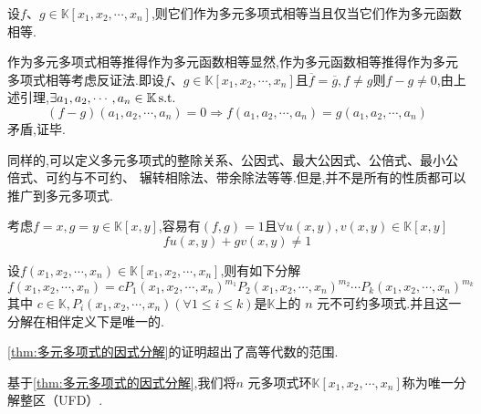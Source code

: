 \begin{green}
\begin{corollary}[充要条件]\label{cor:充要条件}
     设$f$、$g\in\mathbb{K}\left[
        x_1,x_2,\cdots,x_n
    \right]$,则它们作为多元多项式相等当且仅当它们作为多元函数相等.
\end{corollary}
\begin{Proof}
作为多元多项式相等推得作为多元函数相等显然,作为多元函数相等推得作为多元多项式相等考虑反证法.即设$f$、$g\in\mathbb{K}\left[
    x_1,x_2,\cdots,x_n
\right]$且$\overline{f}=\overline{g},f\neq g$则$f-g\neq 0$,由上述引理,$\exists a_1,a_2,\cdots,a_n\in\mathbb{K}\,\textup{s.t.}$
\[
\left(f-g\right)
\left(
    a_1,a_2,\cdots,a_n
\right)=0\Longrightarrow
f\left(
    a_1,a_2,\cdots,a_n
\right)=g\left(
    a_1,a_2,\cdots,a_n
\right)
\]
矛盾,证毕.
\end{Proof}
\end{green}
\begin{red}
\begin{remark}
    同样的,可以定义多元多项式的整除关系、公因式、最大公因式、公倍式、最小公倍式、可约与不可约、
    辗转相除法、带余除法等等.但是,并不是所有的性质都可以推广到多元多项式.
\end{remark}
\end{red}
\begin{brown}
\begin{example}
    考虑$f=x,g=y\in\mathbb{K}\left[x,y\right]$,容易有$\left(f,g\right)=1$且$\forall 
    u\left(x,y\right),v\left(x,y\right)\in\mathbb{K}\left[x,y\right]$
    \[
     fu\left(x,y\right) +gv\left(x,y\right)\neq 1
    \]
\end{example}
\end{brown}
\begin{formal}
\begin{theorem}[多元多项式的因式分解]\label{thm:多元多项式的因式分解}
    设$f\left(
        x_1,x_2,\cdots,x_n
    \right)\in\mathbb{K}\left[
        x_1,x_2,\cdots,x_n
    \right]$,则有如下分解\[
    f\left(
           x_1,x_2,\cdots,x_n  
    \right)=
    cP_1\left(
        x_1,x_2,\cdots,x_n  
    \right)^{m_1}P_2\left(
        x_1,x_2,\cdots,x_n
    \right)^{m_2}\cdots P_k\left(
        x_1,x_2,\cdots,x_n
    \right)^{m_k}
    \]
    其中
    $ 
    c\in\mathbb{K},P_i \left(
        x_1,x_2,\cdots,x_n
    \right)\left(
        \forall 1\leqslant i\leqslant k
    \right)$是$\mathbb{K}$上的 $n$ 元不可约多项式.并且这一分解在相伴定义下是唯一的.
\end{theorem}
\end{formal}
\begin{red}
\begin{remark}
    \cref{thm:多元多项式的因式分解}的证明超出了高等代数的范围.
\end{remark}
\end{red}
\begin{red}
\begin{remark}
    基于\cref{thm:多元多项式的因式分解},我们将$n$ 元多项式环$\mathbb{K}\left[
        x_1,x_2,\cdots,x_n
    \right]$称为唯一分解整区（\textup{UFD}）.
\end{remark}
\end{red}
\newpage
